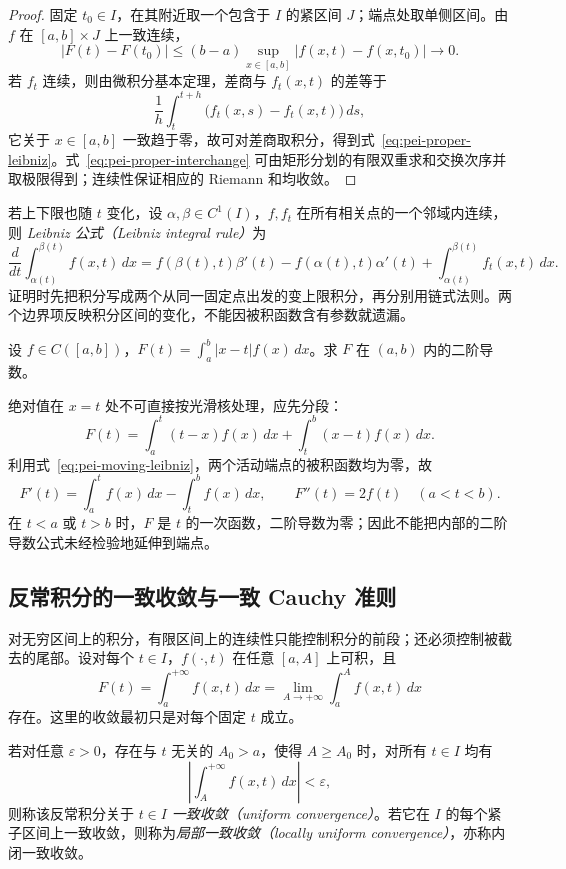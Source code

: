 \begin{proof}
固定 $t_0\in I$，在其附近取一个包含于 $I$ 的紧区间 $J$；端点处取单侧区间。由 $f$ 在 $[a,b]\times J$ 上一致连续，
\[
|F(t)-F(t_0)|\le (b-a)\sup_{x\in[a,b]}|f(x,t)-f(x,t_0)|\longrightarrow0.
\]
若 $f_t$ 连续，则由微积分基本定理，差商与 $f_t(x,t)$ 的差等于
\[
\frac1h\int_t^{t+h}\bigl(f_t(x,s)-f_t(x,t)\bigr)\,ds,
\]
它关于 $x\in[a,b]$ 一致趋于零，故可对差商取积分，得到式~\eqref{eq:pei-proper-leibniz}。式~\eqref{eq:pei-proper-interchange} 可由矩形分划的有限双重求和交换次序并取极限得到；连续性保证相应的 Riemann 和均收敛。
\end{proof}

若上下限也随 $t$ 变化，设 $\alpha,\beta\in C^1(I)$，$f,f_t$ 在所有相关点的一个邻域内连续，则 \emph{Leibniz 公式（Leibniz integral rule）}为
\begin{equation}
\label{eq:pei-moving-leibniz}
\frac{d}{dt}\int_{\alpha(t)}^{\beta(t)}f(x,t)\,dx
=f(\beta(t),t)\beta'(t)-f(\alpha(t),t)\alpha'(t)
+\int_{\alpha(t)}^{\beta(t)}f_t(x,t)\,dx.
\end{equation}
证明时先把积分写成两个从同一固定点出发的变上限积分，再分别用链式法则。两个边界项反映积分区间的变化，不能因被积函数含有参数就遗漏。

\begin{example}
\label{ex:pei-absolute-kernel}
设 $f\in C([a,b])$，$F(t)=\int_a^b|x-t|f(x)\,dx$。求 $F$ 在 $(a,b)$ 内的二阶导数。
\end{example}
\begin{solve}
绝对值在 $x=t$ 处不可直接按光滑核处理，应先分段：
\[
F(t)=\int_a^t(t-x)f(x)\,dx+\int_t^b(x-t)f(x)\,dx.
\]
利用式~\eqref{eq:pei-moving-leibniz}，两个活动端点的被积函数均为零，故
\[
F'(t)=\int_a^t f(x)\,dx-\int_t^b f(x)\,dx,
\qquad F''(t)=2f(t)\quad(a<t<b).
\]
在 $t<a$ 或 $t>b$ 时，$F$ 是 $t$ 的一次函数，二阶导数为零；因此不能把内部的二阶导数公式未经检验地延伸到端点。
\end{solve}

\subsection{反常积分的一致收敛与一致 Cauchy 准则}

对无穷区间上的积分，有限区间上的连续性只能控制积分的前段；还必须控制被截去的尾部。设对每个 $t\in I$，$f(\cdot,t)$ 在任意 $[a,A]$ 上可积，且
\[
F(t)=\int_a^{+\infty}f(x,t)\,dx
=\lim_{A\to+\infty}\int_a^A f(x,t)\,dx
\]
存在。这里的收敛最初只是对每个固定 $t$ 成立。

\begin{definition}
\label{def:pei-uniform-improper}
若对任意 $\varepsilon>0$，存在与 $t$ 无关的 $A_0>a$，使得 $A\ge A_0$ 时，对所有 $t\in I$ 均有
\[
\left|\int_A^{+\infty}f(x,t)\,dx\right|<\varepsilon,
\]
则称该反常积分关于 $t\in I$ \emph{一致收敛（uniform convergence）}。若它在 $I$ 的每个紧子区间上一致收敛，则称为\emph{局部一致收敛（locally uniform convergence）}，亦称内闭一致收敛。
\end{definition}

